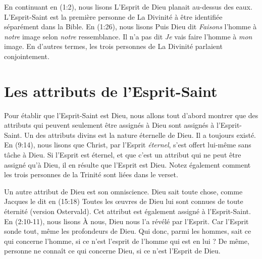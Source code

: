En continuant en (1:2), nous lisons\frcolon{}
 \Og L'Esprit de Dieu planait au-dessus des eaux. \Fg{}
 L'Esprit-Saint est la première personne de La Divinité à être identifiée
 séparément dans la Bible.
 En (1:26), nous lisons\frcolon{}
 \Og Puis Dieu dit\frcolon{} \emph{Faisons} l'homme à \emph{notre} image
 selon \emph{notre} ressemblance. \Fg{}
 Il n'a pas dit\frcolon{} \Og \emph{Je} vais faire l'homme à \emph{mon} image. \Fg{}
 En d'autres termes, les trois personnes de La Divinité parlaient conjointement.

\section{Les attributs de l'Esprit-Saint}

Pour établir que l'Esprit-Saint est Dieu, nous allons tout d'abord montrer
 que des attributs qui peuvent seulement être assignés à Dieu sont assignés à
 l'Esprit-Saint.
 Un des attributs divins est la nature éternelle de Dieu.
 Il a toujours existé. En (9:14), nous lisons que \Og Christ,
 par l'Esprit \emph{éternel}, s'est offert lui-même sans tâche à Dieu. \Fg{}
 Si l'Esprit est éternel, et que c'est un attribut qui ne peut être assigné
 qu'à Dieu, il en résulte que l'Esprit est Dieu.
 Notez également comment les trois personnes de la Trinité sont liées
 dans le verset.

Un autre attribut de Dieu est son omniscience. Dieu sait toute chose, comme
 Jacques le dit en (15:18)\frcolon{}
 \Og Toutes les œuvres de Dieu lui sont connues de toute éternité \Fg{} (version Ostervald).
 Cet attribut est également assigné à
 l'Esprit-Saint. En (2:10-11), nous lisons\frcolon{} \Og À nous, Dieu
 nous l'a révélé par l'Esprit. Car l'Esprit sonde tout, même les profondeurs de
 Dieu. Qui donc, parmi les hommes, sait ce qui concerne l'homme, si ce n'est
 l'esprit de l'homme qui est en lui ? De même, personne ne connaît ce qui
 concerne Dieu, si ce n'est l'Esprit de Dieu. \Fg{}

